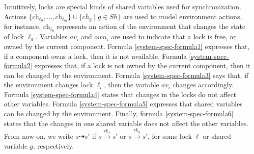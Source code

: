 Intuitively, locks are special kinds of shared variables used for synchronization.  Actions $\{\textit{ch}_{\ell_0},\dots,\textit{ch}_{\ell_m}\} \cup \{\mathit{ch}_g \mid g \in \mathit{Sh}\}$ 
are used to model environment actions, for instance, $\textit{ch}_{\ell_0}$ represents an action of the environment that changes the state of lock $\ell_0$.  Variables $\mathit{av}_i$ and
$\mathit{own}_i$ are used to indicate that a lock is free,  or owned by the current component.  Formula \ref{system-spec-formula1} expresses that, if a component owns a lock, then it is not available.
Formula \ref{system-spec-formula2}  expresses that, if a lock is not owned by the current component, then it can be changed by the environment.  Formula \ref{system-spec-formula3} says that, if the environment changes lock $\ell_i$, then the variable 
$\mathit{av}_i$ changes accordingly.  Formula \ref{system-spec-formula4} states that changes in the locks do not affect other variables.  Formula \ref{system-spec-formula5} expresses that shared variables can be changed by the environment. Finally, formula \ref{system-spec-formula6} states that the changes in one shared variable does not affect the other variables.
From now on, we write $s \dashrightarrow s'$ if $s \xrightarrow{\textit{ch}_\ell} s'$ or $s \xrightarrow{\textit{ch}_g} s'$, for some lock $\ell$ or shared variable $g$, respectively.


